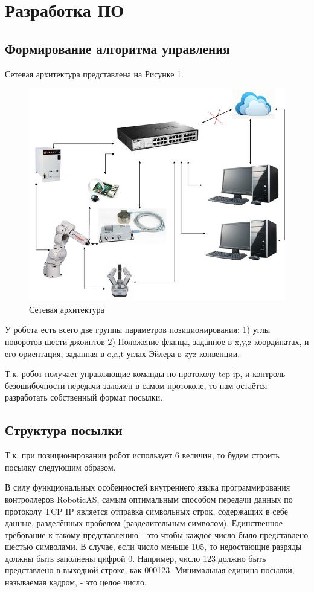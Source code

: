 \documentclass[a4paper,14pt,russian]{extreport} \usepackage{extsizes}
\begin{document}
	\chapter{Разработка ПО}
	\section{Формирование алгоритма управления}
	Сетевая архитектура представлена на Рисунке 1.
	\begin{figure}[h]
		\centering		 
		\includegraphics[width=5.5in]{./img/img42.jpg}	
		\caption{Сетевая архитектура}
		\label{fig_img51}
	\end{figure}
	
	У робота есть всего две группы параметров позиционирования: 
	1) углы поворотов шести джоинтов 
	2) Положение фланца, заданное в x,y,z координатах, и его ориентация, заданная в o,a,t углах  Эйлера в zyz конвенции.
	
	Т.к. робот получает управляющие команды по протоколу tcp ip, и контроль безошибочности передачи заложен в самом протоколе, то нам остаётся разработать собственный формат посылки.
	\section{Структура посылки}
	 Т.к. при позиционировании робот использует 6 величин, то будем строить посылку следующим образом.
	 
	 В силу функциональных особенностей внутреннего языка программирования контроллеров RoboticAS, самым оптимальным способом передачи данных по протоколу TCP IP является отправка символьных строк, содержащих в себе данные, разделённых пробелом (разделительным символом).  Единственное требование к такому представлению - это чтобы каждое число было представлено шестью символами. В случае, если число меньше 105, то недостающие разряды должны быть заполнены цифрой 0. Например, число 123 должно быть представлено в выходной строке, как 000123.
	 Минимальная единица посылки, называемая кадром, - это целое число. 
	 
\end{document}
